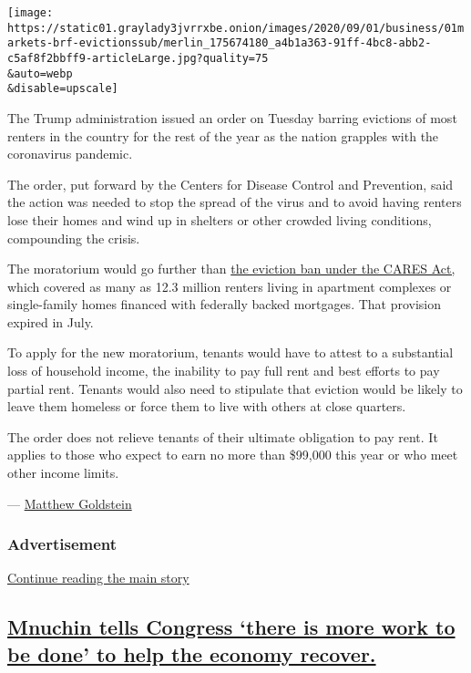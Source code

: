 \texttt{[image: https://static01.graylady3jvrrxbe.onion/images/2020/09/01/business/01markets-brf-evictionssub/merlin\_175674180\_a4b1a363-91ff-4bc8-abb2-c5af8f2bbff9-articleLarge.jpg?quality=75\\\&auto=webp\\\&disable=upscale]}

The Trump administration issued an order on Tuesday barring evictions of
most renters in the country for the rest of the year as the nation
grapples with the coronavirus pandemic.

The order, put forward by the Centers for Disease Control and
Prevention, said the action was needed to stop the spread of the virus
and to avoid having renters lose their homes and wind up in shelters or
other crowded living conditions, compounding the crisis.

The moratorium would go further than
\href{https://www.nytimes3xbfgragh.onion/2020/07/23/business/evictions-moratorium-cares-act.html}{the
eviction ban under the CARES Act,} which covered as many as 12.3 million
renters living in apartment complexes or single-family homes financed
with federally backed mortgages. That provision expired in July.

To apply for the new moratorium, tenants would have to attest to a
substantial loss of household income, the inability to pay full rent and
best efforts to pay partial rent. Tenants would also need to stipulate
that eviction would be likely to leave them homeless or force them to
live with others at close quarters.

The order does not relieve tenants of their ultimate obligation to pay
rent. It applies to those who expect to earn no more than \$99,000 this
year or who meet other income limits.

---
\href{https://www.nytimes3xbfgragh.onion/by/matthew-goldstein}{Matthew
Goldstein}

\hypertarget{advertisement}{%
\subsubsection{Advertisement}\label{advertisement}}

\protect\hyperlink{after-dfp-ad-mid1}{Continue reading the main story}

\hypertarget{mnuchin-tells-congress-there-is-more-work-to-be-done-to-help-the-economy-recover}{%
\subsection{\texorpdfstring{\protect\hyperlink{mnuchin-tells-congress-there-is-more-work-to-be-done-to-help-the-economy-recover}{Mnuchin
tells Congress `there is more work to be done' to help the economy
recover.}}{Mnuchin tells Congress `there is more work to be done' to help the economy recover.}}\label{mnuchin-tells-congress-there-is-more-work-to-be-done-to-help-the-economy-recover}}

